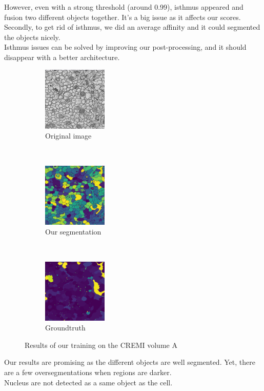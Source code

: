 However, even with a strong threshold (around 0.99), isthmus appeared and fusion two different objects together.
It's a big issue as it affects our scores.\\
Secondly, to get rid of isthmus, we did an average affinity and it could segmented the objects nicely.\\
Isthmus issues can be solved by improving our post-processing, and it should disappear with a better architecture.\\

\begin{figure}[t!]
    \centering
    \begin{subfigure}[t]{0.5\textwidth}
        \centering
        \includegraphics[height=1.2in]{./images/cremi_orig_1.png}
        \caption{Original image}
    \end{subfigure}%
    ~ 
    \begin{subfigure}[t]{0.5\textwidth}
        \centering
        \includegraphics[height=1.2in]{./images/cremi_out_1.png}
        \caption{Our segmentation}
    \end{subfigure}
    ~ 
    \begin{subfigure}[t]{0.5\textwidth}
        \centering
        \includegraphics[height=1.2in]{./images/cremi_gt_1.png}
        \caption{Groundtruth}
    \end{subfigure}
    \caption{Results of our training on the CREMI volume A}
\end{figure}

Our results are promising as the different objects are well segmented. 
Yet, there are a few oversegmentations when regions are darker.\\ 
Nucleus are not detected as a same object as the cell.\\

